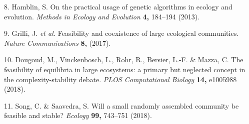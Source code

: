 \documentclass[]{article}
\begin{document}
\hypertarget{ref-Hamblin2013}{}
8. Hamblin, S. On the practical usage of genetic algorithms in ecology
and evolution. \emph{Methods in Ecology and Evolution} \textbf{4,}
184--194 (2013).

\hypertarget{ref-Grilli2017}{}
9. Grilli, J. \emph{et al.} Feasibility and coexistence of large
ecological communities. \emph{Nature Communications} \textbf{8,} (2017).

\hypertarget{ref-Dougoud2018}{}
10. Dougoud, M., Vinckenbosch, L., Rohr, R., Bersier, L.-F. \& Mazza, C.
The feasibility of equilibria in large ecosystems: a primary but
neglected concept in the complexity-stability debate. \emph{PLOS
Computational Biology} \textbf{14,} e1005988 (2018).

\hypertarget{ref-Song2018}{}
11. Song, C. \& Saavedra, S. Will a small randomly assembled community
be feasible and stable? \emph{Ecology} \textbf{99,} 743--751 (2018).
\end{document}
